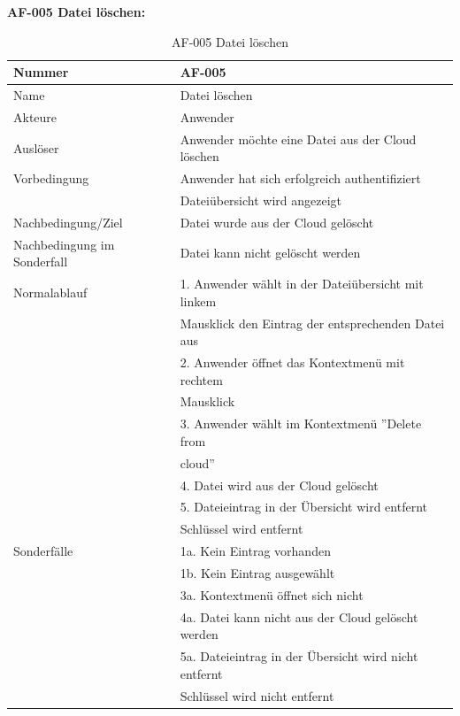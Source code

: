 \documentclass[12pt,a4paper,bibliography=totocnumbered,listof=totocnumbered]{scrartcl}
\begin{document}
\textbf{AF-005 Datei l\"oschen:}
\begin{table}[!h]
	\centering
	\begin{tabular}{|l|l|}
		\hline
		Nummer & AF-005\\
		\hline
		Name & Datei löschen\\
		\hline
		Akteure & Anwender\\
		\hline
		Auslöser & Anwender möchte eine Datei aus der Cloud löschen\\
		\hline
		Vorbedingung & Anwender hat sich erfolgreich authentifiziert \\ & Dateiübersicht wird angezeigt\\
		\hline
		Nachbedingung/Ziel & Datei wurde aus der Cloud gelöscht \\
		\hline
		Nachbedingung im Sonderfall & Datei kann nicht gelöscht werden \\
		\hline
		Normalablauf & 1. Anwender wählt in der Dateiübersicht mit linkem \\&Mausklick den Eintrag der entsprechenden Datei aus \\ & 2. Anwender öffnet das Kontextmenü mit rechtem\\& Mausklick \\ & 3. Anwender wählt im Kontextmenü ''Delete from \\&cloud'' \\  & 4. Datei wird aus der Cloud gelöscht \\ & 5. Dateieintrag in der Übersicht wird entfernt \\& Schlüssel wird entfernt \\
		\hline
		Sonderfälle & 1a. Kein Eintrag vorhanden\\& 1b. Kein Eintrag ausgewählt\\ & 3a. Kontextmenü öffnet sich nicht \\& 4a. Datei kann nicht aus der Cloud gelöscht werden \\ & 5a. Dateieintrag in der Übersicht wird nicht entfernt\\& Schlüssel wird nicht entfernt\\
		\hline
	\end{tabular}
	\caption{AF-005 Datei löschen}
	\label{tab:AF-005 Datei loeschen}
\end{table}
\pagebreak
\end{document}
